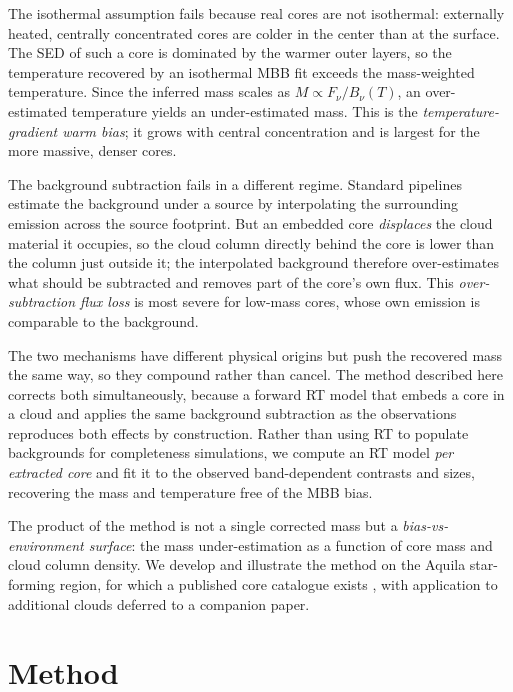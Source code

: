 \documentclass[11pt,a4paper]{article}
\begin{document}
The isothermal assumption fails because real cores are not isothermal:
externally heated, centrally concentrated cores are colder in the center
than at the surface. The SED of such a core is dominated by the warmer
outer layers, so the temperature recovered by an isothermal MBB fit
exceeds the mass-weighted temperature. Since the inferred mass scales as
$M \propto F_\nu / B_\nu(T)$, an over-estimated temperature yields an
under-estimated mass. This is the \emph{temperature-gradient warm bias};
it grows with central concentration and is largest for the more massive,
denser cores.

The background subtraction fails in a different regime. Standard pipelines
estimate the background under a source by interpolating the surrounding
emission across the source footprint. But an embedded core \emph{displaces}
the cloud material it occupies, so the cloud column directly behind the core
is lower than the column just outside it; the interpolated background
therefore over-estimates what should be subtracted and removes part of the
core's own flux. This \emph{over-subtraction flux loss} is most severe for
low-mass cores, whose own emission is comparable to the background.

The two mechanisms have different physical origins but push the recovered
mass the same way, so they compound rather than cancel. The method
described here corrects both simultaneously, because a forward RT model
that embeds a core in a cloud and applies the same background subtraction
as the observations reproduces both effects by construction. Rather than
using RT to populate backgrounds for completeness simulations, we compute
an RT model \emph{per extracted core} and fit it to the observed
band-dependent contrasts and sizes, recovering the mass and temperature
free of the MBB bias.

The product of the method is not a single corrected mass but a
\emph{bias-vs-environment surface}: the mass under-estimation as a function
of core mass and cloud column density. We develop and illustrate the method
on the Aquila star-forming region, for which a published core catalogue exists \citep{Konyves+2015}, with application to additional clouds deferred to a companion paper.

\section{Method}
\end{document}

